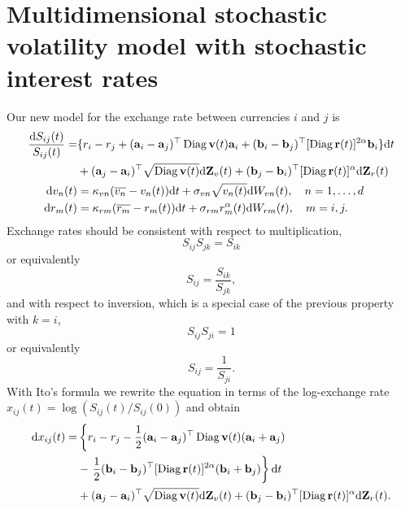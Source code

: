 \documentclass[12pt]{report}
\begin{document}
\section{Multidimensional stochastic volatility model with stochastic interest rates}
Our new model for the exchange rate between currencies $i$ and $j$ is
\begin{align}
\frac{\mathrm{d} S_{ij}(t)}{S_{ij}(t)} =& \{r_{i}-r_{j}+(\mathbf{a}_{i} - \mathbf{a}_{j})^{\top} \operatorname{Diag}\mathbf{v}(t)\mathbf{a}_{i} + (\mathbf{b}_{i} - \mathbf{b}_{j})^{\top} [{\operatorname{Diag}\mathbf{r}(t)}]^{2\alpha} \mathbf{b}_{i} \}\mathrm{d}t \notag \\
&+(\mathbf{a}_{j} - \mathbf{a}_{i})^{\top} \sqrt{\operatorname{Diag}\mathbf{v}(t)} \mathrm{d} \mathbf{Z}_v(t) +(\mathbf{b}_{j} - \mathbf{b}_{i})^{\top} [{\operatorname{Diag}\mathbf{r}(t)}]^{\alpha}\mathrm{d}\mathbf{Z}_r(t) \\
\mathrm{d} v_{n}(t)&=\kappa_{vn}(\overline{v_{n}}-v_{n}(t)) \mathrm{d} t+\sigma_{vn} \sqrt{v_{n}(t)} \mathrm{d} W_{vn}(t), \quad n=1, \ldots, d\\
\mathrm{d}  r_{m}(t)&=\kappa_{rm}(\overline{r_{m}}-r_{m}(t)) \mathrm{d} t+\sigma_{rm} r_{m}^{\alpha}(t) \mathrm{d} W_{rm}(t), \quad m = i,j.
\end{align}
Exchange rates should be consistent with respect to multiplication,
\begin{equation}
S_{ij}S_{jk} = S_{ik}
\end{equation}
or equivalently
\begin{equation}
S_{ij} = \frac{S_{ik}}{S_{jk}},
\end{equation}
and with respect to inversion, which is a special case of the previous property with $k = i$,
\begin{equation}
S_{ij}S_{ji} = 1
\end{equation}
or equivalently
\begin{equation}
S_{ij} = \frac{1}{S_{ji}}.
\end{equation}
With Ito's formula we rewrite the equation in terms of the log-exchange rate $x_{ij}(t) = \log (S_{ij}(t)/S_{ij}(0))$ and obtain
\begin{align}
    \mathrm{d} x_{ij}(t) =& \left\{r_{i}-r_{j} - \frac{1}{2}(\mathbf{a}_{i} - \mathbf{a}_{j})^{\top} \operatorname{Diag}\mathbf{v}(t)(\mathbf{a}_{i} + \mathbf{a}_{j}) \right. \notag \\
    &- \left. \frac{1}{2}(\mathbf{b}_i - \mathbf{b}_j)^{\top}  [{\operatorname{Diag}\mathbf{r}(t)}]^{2\alpha}    (\mathbf{b}_{i} + \mathbf{b}_{j})      \right\} \mathrm{d}t \notag \\ 
    &+  (\mathbf{a}_{j} - \mathbf{a}_{i})^{\top} \sqrt{\operatorname{Diag}\mathbf{v}(t)} \mathrm{d} \mathbf{Z}_v(t)+(\mathbf{b}_{j} - \mathbf{b}_{i})^{\top} [{\operatorname{Diag}\mathbf{r}(t)}]^{\alpha}\mathrm{d}\mathbf{Z}_r(t).
\end{align}
\end{document}
